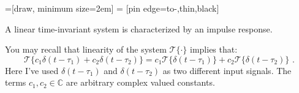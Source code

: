 =[draw, minimum size=2em]
 = [pin edge={to-,thin,black}]

\begin{marginfigure}
\begin{center}


\end{center}
\caption{A linear time-invariant system is characterized by an impulse response.}
\end{marginfigure}

You may recall that linearity of the system $\mathcal{T}\{\cdot\}$ implies that:
\begin{equation}
\mathcal{T}\{c_1 \delta(t-\tau_1) + c_2 \delta(t-\tau_2)\} = c_1 \mathcal{T}\{\delta(t-\tau_1)\}+ c_2 \mathcal{T}\{\delta(t-\tau_2)\}\,\,.
\end{equation}
Here I've used $\delta(t-\tau_1)$ and $\delta(t-\tau_2)$ as two different input signals. The terms $c_1,c_2\in \mathbb{C}$ are arbitrary complex valued constants.

